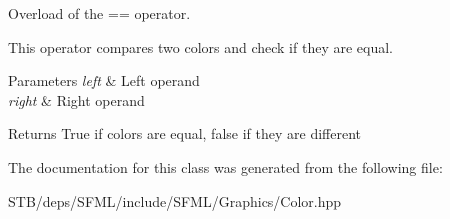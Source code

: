 Overload of the == operator. 

This operator compares two colors and check if they are equal.


\begin{DoxyParams}{Parameters}
{\em left} & Left operand \\
\hline
{\em right} & Right operand\\
\hline
\end{DoxyParams}
\begin{DoxyReturn}{Returns}
True if colors are equal, false if they are different 
\end{DoxyReturn}


The documentation for this class was generated from the following file\+:\begin{DoxyCompactItemize}
\item 
S\+T\+B/deps/\+S\+F\+M\+L/include/\+S\+F\+M\+L/\+Graphics/Color.\+hpp\end{DoxyCompactItemize}

